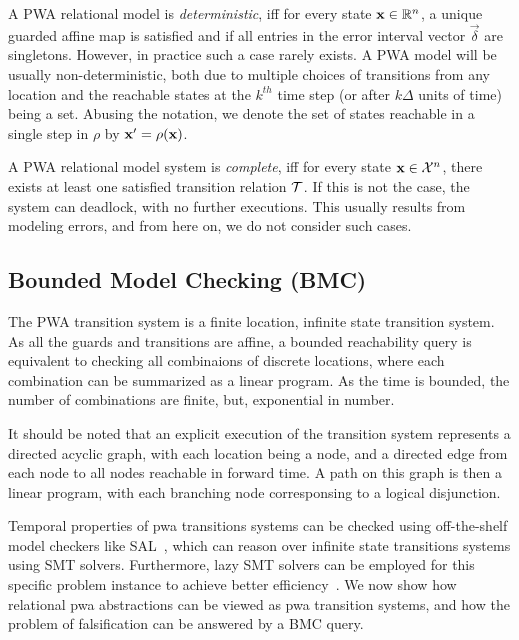
A PWA relational model is \textit{deterministic}, iff for every state
$\mathbf{x}\in\mathbb{R}^n$, a unique guarded affine map is satisfied and if all
entries in the error interval vector $\vec{\delta}$ are singletons.
However, in practice such a case rarely exists. A PWA model will be
usually non-deterministic, both due to multiple choices of transitions
from any location and the reachable states at the $k^{th}$ time step
(or after $k\Delta$ units of time) being a set.  Abusing the notation,
we denote the set of states reachable in a single step in $\rho$ by
$\mathbf{x}' = \rho(\mathbf{x})$.

A PWA relational model system is \textit{complete}, iff for every
state $\mathbf{x}\in\mathcal{X}^n$, there exists at least one satisfied
transition relation $\mathcal{T}$. If this is not the case, the system can
deadlock, with no further executions. This usually results from
modeling errors, and from here on, we do not consider such cases.

\subsection{Bounded Model Checking (BMC)}
The PWA transition system is a finite location, infinite state
transition system. As all the guards and transitions are affine, a
bounded reachability query is equivalent to checking all
combinaions of discrete locations, where each combination can be
summarized as a linear program. As the time is bounded, the number of
combinations are finite, but, exponential in number.

It should be noted that an explicit execution of the transition system
represents a directed acyclic graph, with each location being a node,
and a directed edge from each node to all nodes reachable in forward
time. A path on this graph is then a linear program, with each
branching node corresponsing to a logical disjunction.

Temporal properties of pwa transitions systems can be checked using
off-the-shelf model checkers like SAL~\cite{SAL-SRI}, which can reason
over infinite state transitions systems using SMT solvers.
Furthermore, lazy SMT solvers can be employed for this specific
problem instance to achieve better efficiency~\cite{shoukry2017smc}.
We now show how relational pwa abstractions can be viewed as pwa
transition systems, and how the problem of falsification can
be answered by a BMC query.

